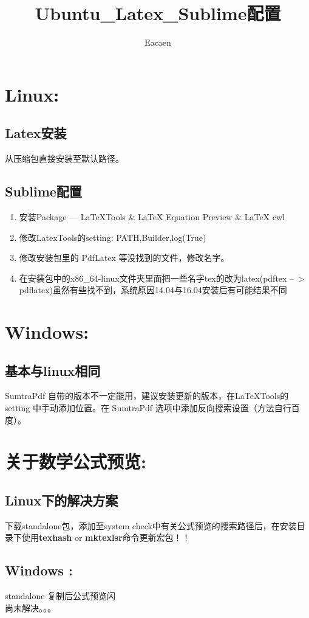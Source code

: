 \documentclass{article}
\begin{document}
\title{Ubuntu\_Latex\_Sublime配置}
\author{Eacaen}
\maketitle
	\section{Linux: }
		\subsection{Latex安装}
			从压缩包直接安装至默认路径。
		\subsection{Sublime配置}
	   		\begin{enumerate}
				\item 安装Package --- LaTeXTools \& LaTeX Equation Preview \& LaTeX cwl
				\item 修改LatexTools的setting: PATH,Builder,log(True)
				\item 修改安装包里的 PdfLatex 等没找到的文件，修改名字。
				\item 在安装包中的x86\_64-linux文件夹里面把一些名字tex的改为latex(pdftex --\ > pdflatex)虽然有些找不到，系统原因14.04与16.04安装后有可能结果不同
			\end{enumerate}
    \section{Windows: }
    	\subsection{基本与linux相同}
    		SumtraPdf 自带的版本不一定能用，建议安装更新的版本，在LaTeXTools的 setting 中手动添加位置。在 SumtraPdf 选项中添加反向搜索设置（方法自行百度）。
    \section{关于数学公式预览: }
    	\subsection{Linux下的解决方案}
    		下载standalone包，添加至system check中有关公式预览的搜索路径后，在安装目录下使用\textbf{texhash} or \textbf{mktexlsr}命令更新宏包！！
    	\subsection{Windows :}
    		standalone 复制后公式预览闪\\
    	 	尚未解决。。。
 
\end{document}
